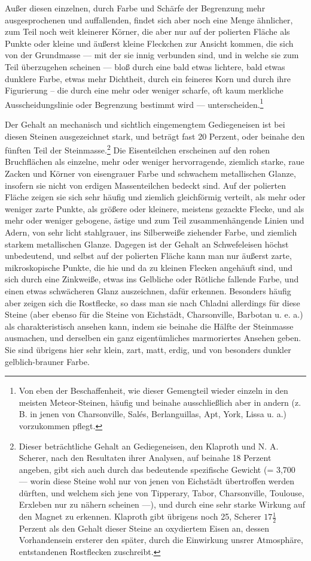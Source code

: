\documentclass[a4paper, 11pt, oneside, german]{article}
\begin{document}
Außer diesen einzelnen, durch Farbe und Schärfe der Begrenzung mehr ausgesprochenen und auffallenden, findet sich aber noch eine Menge ähnlicher, zum Teil noch weit kleinerer Körner, die aber nur auf der polierten Fläche als Punkte oder kleine und äußerst kleine Fleckchen zur Ansicht kommen, die sich von der Grundmasse --- mit der sie innig verbunden sind, und in welche sie zum Teil überzugehen scheinen --- bloß durch eine bald etwas lichtere, bald etwas dunklere Farbe, etwas mehr Dichtheit, durch ein feineres Korn und durch ihre Figurierung -- die durch eine mehr oder weniger scharfe, oft kaum merkliche Ausscheidungslinie oder Begrenzung bestimmt wird --- unterscheiden.\footnote{Von eben der Beschaffenheit, wie dieser Gemengteil wieder einzeln in den meisten Meteor-Steinen, häufig und beinahe ausschließlich aber in andern (z. B. in jenen von Charsonville, Salés, Berlanguillas, Apt, York, Lissa u. a.) vorzukommen pflegt.}

Der Gehalt an mechanisch und sichtlich eingemengtem Gediegeneisen ist bei diesen Steinen ausgezeichnet stark, und beträgt fast 20 Perzent, oder beinahe den fünften Teil der Steinmasse.\footnote{Dieser beträchtliche Gehalt an Gediegeneisen, den Klaproth und N. A. Scherer, nach den Resultaten ihrer Analysen, auf beinahe 18 Perzent angeben, gibt sich auch durch das bedeutende spezifische Gewicht (= 3,700 --- worin diese Steine wohl nur von jenen von Eichstädt übertroffen werden dürften, und welchem sich jene von Tipperary, Tabor, Charsonville, Toulouse, Erxleben nur zu nähern scheinen ---), und durch eine sehr starke Wirkung auf den Magnet zu erkennen. Klaproth gibt übrigens noch 25, Scherer $17\frac{1}{2}$ Perzent als den Gehalt dieser Steine an oxydiertem Eisen an, dessen Vorhandensein ersterer den später, durch die Einwirkung unsrer Atmosphäre, entstandenen Rostflecken zuschreibt.} Die Eisenteilchen erscheinen auf den rohen Bruchflächen als einzelne, mehr oder weniger hervorragende, ziemlich starke, raue Zacken und Körner von eisengrauer Farbe und schwachem metallischen Glanze, insofern sie nicht von erdigen Massenteilchen bedeckt sind. Auf der polierten Fläche zeigen sie sich sehr häufig und ziemlich gleichförmig verteilt, als mehr oder weniger zarte Punkte, als größere oder kleinere, meistens gezackte Flecke, und als mehr oder weniger gebogene, ästige und zum Teil zusammenhängende Linien und Adern, von sehr licht stahlgrauer, ins Silberweiße ziehender Farbe, und ziemlich starkem metallischen Glanze. Dagegen ist der Gehalt an Schwefeleisen höchst unbedeutend, und selbst auf der polierten Fläche kann man nur äußerst zarte, mikroskopische Punkte, die hie und da zu kleinen Flecken angehäuft sind, und sich durch eine Zinkweiße, etwas ins Gelbliche oder Rötliche fallende Farbe, und einen etwas schwächeren Glanz auszeichnen, dafür erkennen. Besonders häufig aber zeigen sich die Rostflecke, so dass man sie nach Chladni allerdings für diese Steine (aber ebenso für die Steine von Eichstädt, Charsonville, Barbotan u. e. a.) als charakteristisch ansehen kann, indem sie beinahe die Hälfte der Steinmasse ausmachen, und derselben ein ganz eigentümliches marmoriertes Ansehen geben. Sie sind übrigens hier sehr klein, zart, matt, erdig, und von besonders dunkler gelblich-brauner Farbe.
\end{document}
